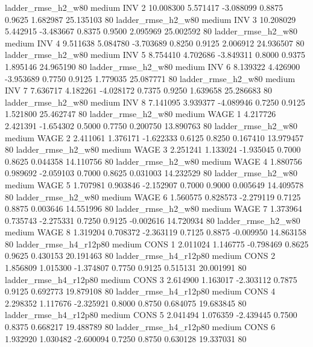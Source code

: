    ladder_rmse_h2_w80     medium      INV                 2 10.008300 5.571417 -3.088099 0.8875 0.9625  1.682987   25.135103 80
    ladder_rmse_h2_w80     medium      INV                 3 10.208029 5.442915 -3.483667 0.8375 0.9500  2.095969   25.002592 80
    ladder_rmse_h2_w80     medium      INV                 4  9.511638 5.084780 -3.703689 0.8250 0.9125  2.006912   24.936507 80
    ladder_rmse_h2_w80     medium      INV                 5  8.754410 4.702686 -3.849311 0.8000 0.9375  1.895146   24.965190 80
    ladder_rmse_h2_w80     medium      INV                 6  8.139322 4.426900 -3.953689 0.7750 0.9125  1.779035   25.087771 80
    ladder_rmse_h2_w80     medium      INV                 7  7.636717 4.182261 -4.028172 0.7375 0.9250  1.639658   25.286683 80
    ladder_rmse_h2_w80     medium      INV                 8  7.141095 3.939377 -4.089946 0.7250 0.9125  1.521800   25.462747 80
    ladder_rmse_h2_w80     medium     WAGE                 1  4.217726 2.421391 -1.654302 0.5000 0.7750  0.200750   13.890763 80
    ladder_rmse_h2_w80     medium     WAGE                 2  2.411061 1.376171 -1.622333 0.6125 0.8250  0.167410   13.979457 80
    ladder_rmse_h2_w80     medium     WAGE                 3  2.251241 1.133024 -1.935045 0.7000 0.8625  0.044358   14.110756 80
    ladder_rmse_h2_w80     medium     WAGE                 4  1.880756 0.989692 -2.059103 0.7000 0.8625  0.031003   14.232529 80
    ladder_rmse_h2_w80     medium     WAGE                 5  1.707981 0.903846 -2.152907 0.7000 0.9000  0.005649   14.409578 80
    ladder_rmse_h2_w80     medium     WAGE                 6  1.560575 0.828573 -2.279119 0.7125 0.8875  0.003646   14.551996 80
    ladder_rmse_h2_w80     medium     WAGE                 7  1.373964 0.735743 -2.275331 0.7250 0.9125 -0.002616   14.720934 80
    ladder_rmse_h2_w80     medium     WAGE                 8  1.319204 0.708372 -2.363119 0.7125 0.8875 -0.009950   14.863158 80
 ladder_rmse_h4_r12p80     medium     CONS                 1  2.011024 1.146775 -0.798469 0.8625 0.9625  0.430153   20.191463 80
 ladder_rmse_h4_r12p80     medium     CONS                 2  1.856809 1.015300 -1.374807 0.7750 0.9125  0.515131   20.001991 80
 ladder_rmse_h4_r12p80     medium     CONS                 3  2.614900 1.163017 -2.303112 0.7875 0.9125  0.692773   19.879108 80
 ladder_rmse_h4_r12p80     medium     CONS                 4  2.298352 1.117676 -2.325921 0.8000 0.8750  0.684075   19.683845 80
 ladder_rmse_h4_r12p80     medium     CONS                 5  2.041494 1.076359 -2.439445 0.7500 0.8375  0.668217   19.488789 80
 ladder_rmse_h4_r12p80     medium     CONS                 6  1.932920 1.030482 -2.600094 0.7250 0.8750  0.630128   19.337031 80
